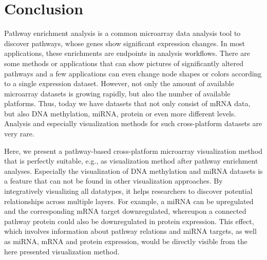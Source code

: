 \documentclass{bioinfo}
\begin{document}



\section{Conclusion}

Pathway enrichment analysis is a common microarray data analysis tool to discover pathways, whose
genes show significant expression changes. In most applications, these enrichments are endpoints in
analysis workflows. There are some methods or applications that can show pictures of significantly
altered pathways and a few applications can even change node shapes or colors according to a single
expression dataset. However, not only the amount of available microarray datasets is growing
rapidly, but also the number of available platforms. Thus, today we have datasets that not only
consist of mRNA data, but also DNA methylation, miRNA, protein or even more different
levels. Analysis and especially visualization methods for such cross-platform datasets are very
rare.

Here, we present a pathway-based cross-platform microarray visualization method that is perfectly
suitable, e.g., as visualization method after pathway enrichment analyses. Especially the
visualization of DNA methylation and miRNA datasets is a feature that can not be found in other
visualization approaches. By integratively visualizing all datatypes, it helps researchers to
discover potential relationships across multiple layers. For example, a miRNA can be upregulated and
the corresponding mRNA target downregulated, whereupon a connected pathway protein could also be
downregulated in protein expression. This effect, which involves information about pathway relations
and miRNA targets, as well as miRNA, mRNA and protein expression, would be directly visible from the
here presented visualization method.

\end{document}
